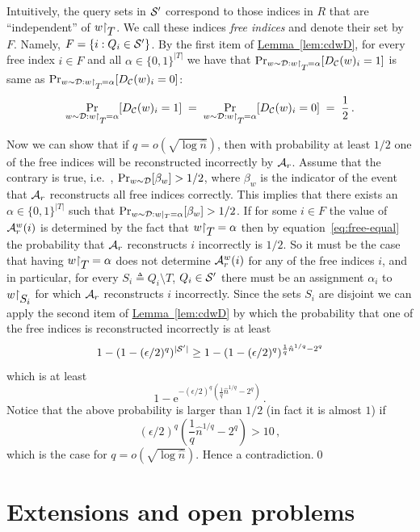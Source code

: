 \documentclass[10pt]{article}
\theoremstyle{definition}
\providecommand{\ie}{i.e.\ }
\numberwithin{equation}{section}
\newcommand{\eee}{\mathrm e}
\newcommand{\expref}[2]{\texorpdfstring{\hyperref[#2]{#1~\ref{#2}}}{#1~\ref{#2}}}
\newcommand{\ALG}{{\cal A}}
\newcommand{\DD}{{\cal D}}
\newcommand{\SUN}{{\cal S}}
\newcommand{\zo}{{\{0,1\}}}
\newcommand{\DEC}{{D_{\cal C}}}
\newcommand{\nrows}{{\hat n }}
\newcommand{\rst}[1]{\ensuremath{{\mathbin\upharpoonright}%
\raise-.9ex\hbox{$#1$}}}
\newcommand{\rstsmall}[1]{\ensuremath{{\mathbin\upharpoonright}%
\raise-.9ex\hbox{\scriptsize $#1$}}}
\begin{document}
Intuitively, the query sets in $\SUN'$ correspond to those indices in $R$ that are ``independent'' of $w\rst{T}$.
We call these indices \emph{free indices} and denote their set by $F$. Namely, $F = \{i:Q_i \in \SUN'\}$.
By the first item of \expref{Lemma}{lem:cdwD}, for every free index $i \in F$ and all $\alpha \in \zo^{|T|}$ we have that
$\Pr_{w \sim \DD : w\rstsmall{T}=\alpha} [\DEC(w)_i = 1]$ is same as
$\Pr_{w \sim \DD : w\rstsmall{T}=\alpha} [\DEC(w)_i = 0]$:
\begin{equation}\label{eq:free-equal}
  \Pr_{w \sim \DD : w\rstsmall{T}=\alpha} [\DEC(w)_i = 1] \;=\; \Pr_{w
  \sim \DD : w\rstsmall{T}=\alpha} [\DEC(w)_i = 0] \;=\; \frac{1}{2}\,.
\end{equation}

Now we can show that if $q = o(\sqrt{\log \nrows})$, then with probability at least $1/2$ one of the free indices will be reconstructed incorrectly by $\ALG_r$.
Assume that the contrary is true, \ie, $\Pr_{w \sim \DD}[\beta_w] > 1/2$, where $\beta_w$ is the indicator of the event that $\ALG_r$ reconstructs all free indices correctly. This implies that there exists an $\alpha \in \zo^{|T|}$ such that
$\Pr_{w\sim \DD: w|_T= \alpha} [\beta_w] > 1/2$.
If for some $i\in F$ the value of $\ALG_r^w(i)$ is
determined by the fact that $w\rst{T} = \alpha$ then by equation~\eqref{eq:free-equal} the probability
that $\ALG_r$ reconstructs $i$ incorrectly is $1/2$. So it must be the
case that having $w\rst{T} = \alpha$ does not determine $\ALG_r^w(i)$
for any of the free indices $i$, and in particular, for every $S_i
\triangleq Q_i \setminus T$, $Q_i \in \SUN'$ there must be an
assignment $\alpha_i$ to $w\rst{S_i}$ for which $\ALG_r$ reconstructs
$i$ incorrectly. Since the sets $S_i$ are disjoint we can apply the
second item of \expref{Lemma}{lem:cdwD} by which the probability that
one of the free indices is reconstructed incorrectly is at least $$1 -
(1-(\epsilon/2)^{q})^{|\SUN'|} \geq 1 -
(1-(\epsilon/2)^{q})^{\frac{1}{q}\nrows^{1/q} - 2^q}$$ which is at
least
\[
1 - \eee^{-(\epsilon/2)^{q} (\frac{1}{q}\nrows^{1/q} - 2^q)}\,.
\]
Notice that the above probability is larger than $1/2$ (in fact it is
almost $1$) if \[
(\epsilon/2)^{q} \left(\frac{1}{q}\nrows^{1/q}-2^q\right) > 10\,,
\]
which is the case for $q = o(\sqrt{\log \nrows})$. Hence a contradiction.\hfill\qed


\section{Extensions and open problems} \label{sec:conclusion}
\end{document}
